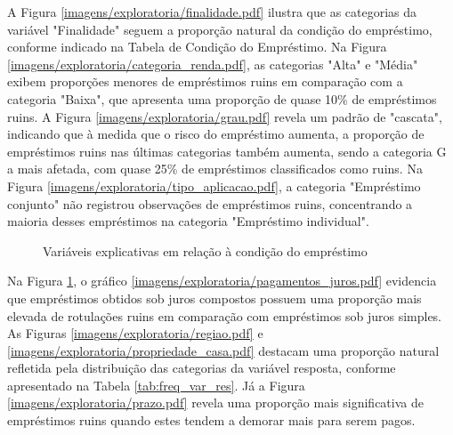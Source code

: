 A Figura \ref{imagens/exploratoria/finalidade.pdf} ilustra que as categorias da variável "Finalidade" 
seguem a proporção natural da condição do empréstimo,
conforme indicado na Tabela de Condição do Empréstimo. Na Figura \ref{imagens/exploratoria/categoria_renda.pdf}, 
as categorias "Alta" e "Média"
exibem proporções menores de empréstimos ruins em comparação com a categoria "Baixa", que apresenta uma proporção de quase 10\% 
de empréstimos ruins. A Figura \ref{imagens/exploratoria/grau.pdf} revela um padrão de "cascata", indicando que à medida que o risco do 
empréstimo aumenta, a proporção de empréstimos ruins nas últimas categorias também aumenta, 
sendo a categoria G a mais afetada, com quase 25\% de empréstimos classificados como ruins. 
Na Figura \ref{imagens/exploratoria/tipo_aplicacao.pdf}, a categoria "Empréstimo conjunto" 
não registrou observações de empréstimos ruins, 
concentrando a maioria desses empréstimos na categoria "Empréstimo individual".


\begin{figure}[H]
  \centering
  \vspace{.5cm}
  \vspace{.5cm}

  \caption{Variáveis explicativas em relação à condição do empréstimo}
  \label{fig:exp_bar2}
\end{figure}

Na Figura \ref{fig:exp_bar2}, o gráfico \ref{imagens/exploratoria/pagamentos_juros.pdf} 
evidencia que empréstimos obtidos sob juros compostos possuem uma proporção 
mais elevada de rotulações ruins em comparação com empréstimos sob juros simples. As Figuras \ref{imagens/exploratoria/regiao.pdf} 
e \ref{imagens/exploratoria/propriedade_casa.pdf}
destacam uma proporção natural refletida pela distribuição das categorias da variável resposta, 
conforme apresentado na Tabela \ref{tab:freq_var_res}. Já a Figura \ref{imagens/exploratoria/prazo.pdf} 
revela uma proporção mais significativa
de empréstimos ruins quando estes tendem a demorar mais para serem pagos.

